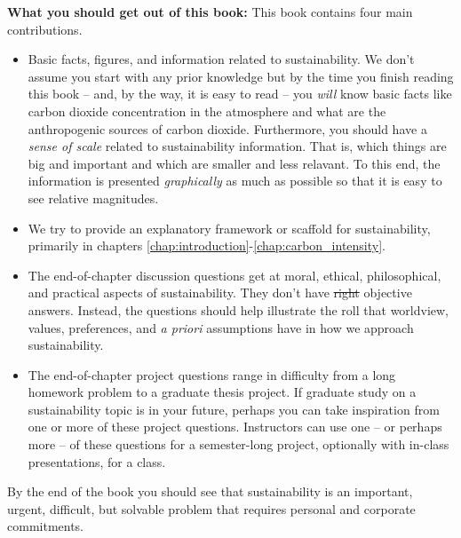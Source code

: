 {\textbf{What you should get out of this book:} This book contains four main 
contributions.
\begin{itemize}
\item Basic facts, figures, and information related to sustainability. We don't 
assume you start with any prior knowledge but by the time you finish reading this
book -- and, by the way, it is easy to read -- you \emph{will} know basic facts
like carbon dioxide concentration in the atmosphere and what are the anthropogenic
sources of carbon dioxide. Furthermore, you should have a \emph{sense of scale}
related to sustainability information. That is, which things are big and 
important and which are smaller and less relavant. To this end, the information
is presented \emph{graphically} as much as possible so that it is easy to see
relative magnitudes.
\item We try to provide an explanatory framework or scaffold for sustainability,
primarily in chapters \ref{chap:introduction}-\ref{chap:carbon_intensity}.
\item The end-of-chapter discussion questions get at moral, ethical, philosophical,
and practical aspects of sustainability. They don't have \sout{right} objective 
answers. Instead, the questions should help illustrate the roll that worldview, 
values, preferences, and \emph{a priori} assumptions have in how we approach sustainability. 
\item The end-of-chapter project questions range in difficulty from a long
homework problem to a graduate thesis project. If graduate study on a sustainability
topic is in your future, perhaps you can take inspiration from one or more of 
these project questions. Instructors can use one -- or perhaps more -- of these 
questions for a semester-long project, optionally with in-class presentations, for a class.
\end{itemize}
By the end of the book you should see that sustainability is an important, 
urgent, difficult, but solvable problem that requires personal and corporate 
commitments. \\

}
